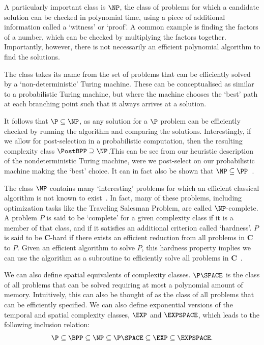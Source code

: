 A particularly important class is $\NP$, the class of problems for which a candidate solution can be checked in polynomial time, using a piece of additional information called a `witness' or `proof'. A common example is finding the factors of a number, which can be checked by multiplying the factors together. Importantly, however, there is not necessarily an efficient polynomial algorithm to find the solutions.\par
The class takes its name from the set of problems that can be efficiently solved by a `non-deterministic' Turing machine.  These can be conceptualised as similar to a probabilistic Turing machine, but where the machine chooses the `best' path at each branching point such that it always arrives at a solution.\par
It follows that $\P\subseteq \NP$, as any solution for a $\P$ problem can be efficiently checked by running the algorithm and comparing the solutions. Interestingly, if we allow for post-selection in a probabilistic computation, then the resulting complexity class $\PostBPP \supseteq \NP$.This can be see from our heuristic description of the nondeterministic Turing machine, were we post-select on our probabilistic machine making the `best' choice. It can in fact also be shown that $\NP\subseteq \PP$~\cite{Gill1974}.\par
The class $\NP$ contains many `interesting' problems for which an efficient classical algorithm is not known to exist~\cite{Nielsen2000}. In fact, many of these problems, including optimization tasks like the Traveling Salesman Problem, are called $\NP$-complete. A problem $P$ is said to be `complete' for a given complexity class if it is a member of that class, and if it satisfies an additional criterion called `hardness'. $P$ is said to be $\mathbf{C}$-hard if there exists an efficient reduction from all problems in $\mathbf{C}$ to $P$. Given an efficient algorithm to solve $P$, this hardness property implies we can use the algorithm as a subroutine to efficiently solve all problems in $\mathbf{C}$~\cite{Nielsen2000}.\par
We can also define spatial equivalents of complexity classes. $\P\SPACE$ is the class of all problems that can be solved requiring at most a polynomial amount of memory. Intuitively, this can also be thought of as the class of all problems that can be efficiently specified. We can also define exponential versions of the temporal and spatial complexity classes, $\EXP$ and $\EXPSPACE$, which leads to the following inclusion relation:
\[\P\subseteq\BPP\subseteq \NP \subseteq \P\SPACE \subseteq \EXP \subseteq \EXPSPACE. \]
